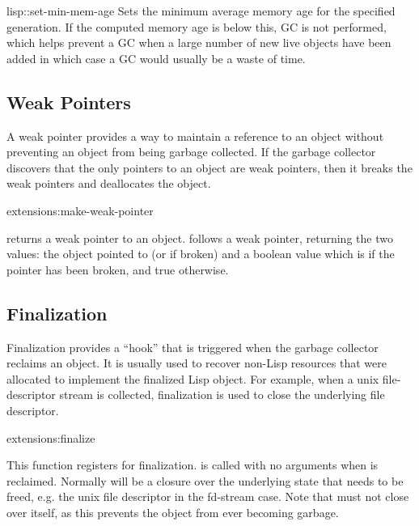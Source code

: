 \begin{defun}{lisp::}{set-min-mem-age}{}
  Sets the minimum average memory age for the specified generation.
  If the computed memory age is below this, GC is not performed, which
  helps prevent a GC when a large number of new live objects have been
  added in which case a GC would usually be a waste of time.
\end{defun}

\subsection{Weak Pointers}

A weak pointer provides a way to maintain a reference to an object
without preventing an object from being garbage collected.  If the
garbage collector discovers that the only pointers to an object are
weak pointers, then it breaks the weak pointers and deallocates the
object.

\begin{defun}{extensions:}{make-weak-pointer}{}
  
   returns a weak pointer to an object.
   follows a weak pointer, returning the two
  values: the object pointed to (or \false{} if broken) and a boolean
  value which is \false{} if the pointer has been broken, and true
  otherwise.
\end{defun}


\subsection{Finalization}

Finalization provides a ``hook'' that is triggered when the garbage
collector reclaims an object.  It is usually used to recover non-Lisp
resources that were allocated to implement the finalized Lisp object.
For example, when a unix file-descriptor stream is collected,
finalization is used to close the underlying file descriptor.

\begin{defun}{extensions:}{finalize}{}
  
  This function registers  for finalization.
   is called with no arguments when  is
  reclaimed.  Normally  will be a closure over the
  underlying state that needs to be freed, e.g. the unix file
  descriptor in the fd-stream case.  Note that  must not
  close over  itself, as this prevents the object from
  ever becoming garbage.
\end{defun}

